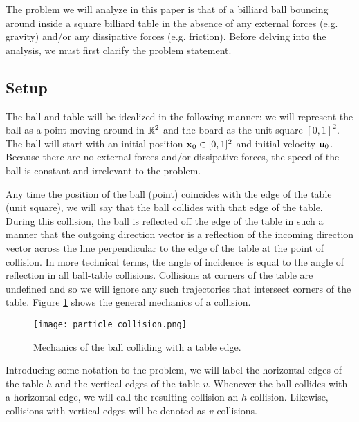 
The problem we will analyze in this paper is that of a billiard ball bouncing around inside a square billiard table in the absence of any external forces (e.g. gravity) and/or any dissipative forces (e.g. friction). Before delving into the analysis, we must first clarify the problem statement.

\subsection{Setup}

The ball and table will be idealized in the following manner: we will represent the ball as a point moving around in $\mathbb R^2$ and the board as the unit square $[0,1]^2$. The ball will start with an initial position $\mathbf{x}_0 \in [0,1]^2$ and initial velocity $\mathbf{u}_0$. Because there are no external forces and/or dissipative forces, the speed of the ball is constant and irrelevant to the problem.

Any time the position of the ball (point) coincides with the edge of the table (unit square), we will say that the ball collides with that edge of the table. During this collision, the ball is reflected off the edge of the table in such a manner that the outgoing direction vector is a reflection of the incoming direction vector across the line perpendicular to the edge of the table at the point of collision. In more technical terms, the angle of incidence is equal to the angle of reflection in all ball-table collisions. Collisions at corners of the table are undefined and so we will ignore any such trajectories that intersect corners of the table. Figure \ref{fig:collision-angle} shows the general mechanics of a collision.

\begin{figure}[H]
  \begin{center}
    \texttt{[image: particle\_collision.png]}
  \end{center}
  \vspace{-.2in} %
  \caption{\label{fig:collision-angle}Mechanics of the ball colliding with a table edge.}
\end{figure}

Introducing some notation to the problem, we will label the horizontal edges of the table $h$ and the vertical edges of the table $v$. Whenever the ball collides with a horizontal edge, we will call the resulting collision an $h$ collision. Likewise, collisions with vertical edges will be denoted as $v$ collisions.

